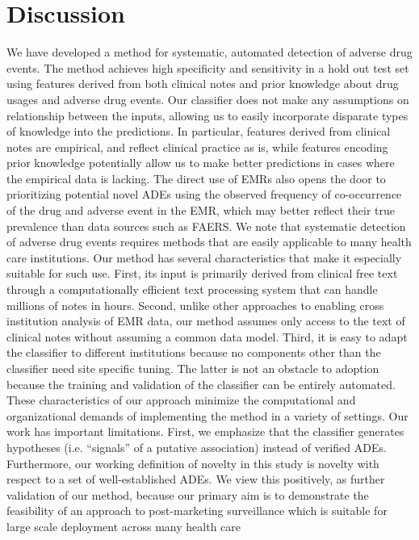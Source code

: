 \section{Discussion}
We have developed a method for systematic, automated detection of
adverse drug events. The method achieves high specificity and
sensitivity in a hold out test set using features derived from both
clinical notes and prior knowledge about drug usages and adverse drug
events. Our classifier does not make any assumptions on relationship
between the inputs, allowing us to easily incorporate disparate types
of knowledge into the predictions. In particular, features derived
from clinical notes are empirical, and reflect clinical practice as
is, while features encoding prior knowledge potentially allow us to
make better predictions in cases where the empirical data is lacking.
The direct use of EMRs also opens the door to prioritizing potential
novel ADEs using the observed frequency of co-occurrence of the drug
and adverse event in the EMR, which may better reflect their true
prevalence than data sources such as FAERS. We note that systematic
detection of adverse drug events requires methods that are easily
applicable to many health care institutions. Our method has several
characteristics that make it especially suitable for such use. First,
its input is primarily derived from clinical free text through a
computationally efficient text processing system that can handle
millions of notes in hours. Second, unlike other approaches to
enabling cross institution analysis of EMR data, our method assumes
only access to the text of clinical notes without assuming a common
data model. Third, it is easy to adapt the classifier to different
institutions because no components other than the classifier need site
specific tuning. The latter is not an obstacle to adoption because the
training and validation of the classifier can be entirely
automated. These characteristics of our approach minimize the
computational and organizational demands of implementing the method in
a variety of settings.  Our work has important limitations. First, we
emphasize that the classifier generates hypotheses (i.e. “signals” of
a putative association) instead of verified ADEs. Furthermore, our
working definition of novelty in this study is novelty with respect to
a set of well-established ADEs. We view this positively, as further
validation of our method, because our primary aim is to demonstrate
the feasibility of an approach to post-marketing surveillance which is
suitable for large scale deployment across many health care
